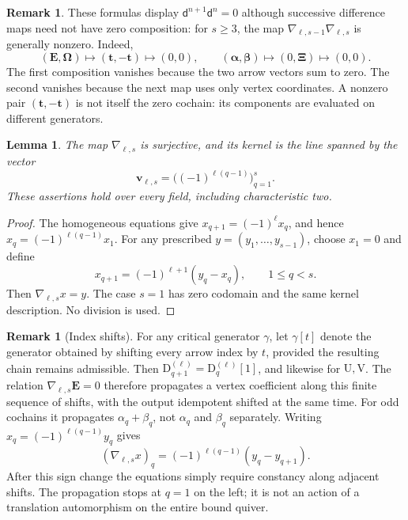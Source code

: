 \documentclass[a4paper,11pt,oneside,reqno]{amsart}
\newtheorem{lemma}[theorem]{Lemma}
\theoremstyle{definition}
\newtheorem{remark}[theorem]{Remark}
\numberwithin{equation}{section}
\begin{document}
	\begin{remark}\label{rem:delta-square-coordinates}
		These formulas display $\mathsf d^{n+1}\mathsf d^n=0$ although successive difference
		maps need not have zero composition: for $s\geq3$, the map
		$\nabla_{\ell,s-1}\nabla_{\ell,s}$ is generally nonzero.  Indeed,
		\[
		(\mathbf E,\boldsymbol\Omega)\longmapsto(\mathbf t,-\mathbf t)
		\longmapsto(0,0),
		\qquad
		(\boldsymbol\alpha,\boldsymbol\beta)\longmapsto(0,\boldsymbol\Xi)
		\longmapsto(0,0).
		\]
		The first composition vanishes because the two arrow vectors sum to
		zero.  The second vanishes because the next map uses only vertex
		coordinates.  A nonzero pair $(\mathbf t,-\mathbf t)$ is not itself
		the zero cochain: its components are evaluated on different generators.
	\end{remark}
	
	\begin{lemma}\label{lem:nabla-kernel-image}
		The map $\nabla_{\ell,s}$ is surjective, and its kernel is the line
		spanned by the vector
		\begin{equation}\label{eq:nabla-kernel-vector}
			\mathbf v_{\ell,s}
			=\bigl((-1)^{\ell(q-1)}\bigr)_{q=1}^{s}.
		\end{equation}
		These assertions hold over every field, including characteristic two.
	\end{lemma}
	
	\begin{proof}
		The homogeneous equations give
		$x_{q+1}=(-1)^\ell x_q$, and hence
		$x_q=(-1)^{\ell(q-1)}x_1$.
		For any prescribed $y=(y_1,\ldots,y_{s-1})$, choose $x_1=0$ and define
		\begin{equation}\label{eq:nabla-right-inverse}
			x_{q+1}=(-1)^{\ell+1}(y_q-x_q),\qquad 1\leq q<s.
		\end{equation}
		Then $\nabla_{\ell,s}x=y$.  The case $s=1$ has zero codomain and the
		same kernel description.  No division is used.
	\end{proof}
	
	\begin{remark}[Index shifts]\label{rem:index-shifts}
		For any critical generator $\gamma$, let $\gamma[t]$ denote the
		generator obtained by shifting every arrow index by $t$, provided
		the resulting chain remains admissible. Then
		$\mathrm{D}_{q+1}^{(\ell)}=\mathrm{D}_q^{(\ell)}[1]$, and likewise for $\mathrm{U},\mathrm{V}$.
		The relation $\nabla_{\ell,s}\mathbf E=0$ therefore propagates a vertex
		coefficient along this finite sequence of shifts, with the output
		idempotent shifted at the same time.  For odd cochains it propagates
		$\alpha_q+\beta_q$, not $\alpha_q$ and $\beta_q$ separately.
		Writing $x_q=(-1)^{\ell(q-1)}y_q$ gives
		\[
		(\nabla_{\ell,s}x)_q
		=(-1)^{\ell(q-1)}(y_q-y_{q+1}).
		\]
		After this sign change the equations simply require constancy along
		adjacent shifts.  The propagation stops at $q=1$ on the left; it is not
		an action of a translation automorphism on the entire bound quiver.
	\end{remark}
	
\end{document}
